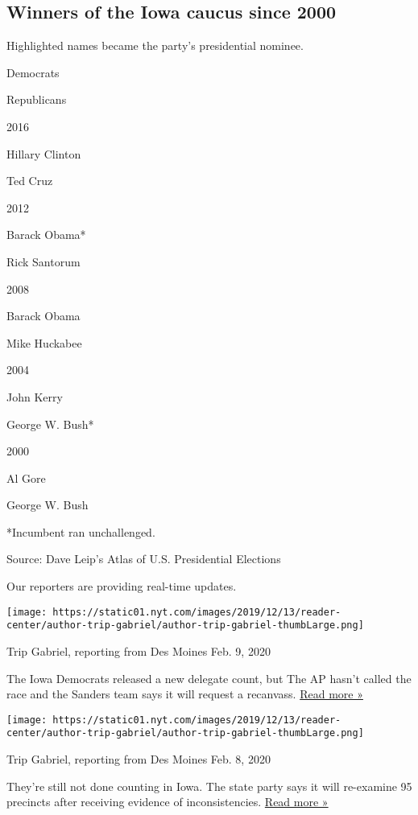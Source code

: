 \hypertarget{winners-of-the-iowa-caucus-since-2000}{%
\subsection{Winners of the Iowa caucus since
2000}\label{winners-of-the-iowa-caucus-since-2000}}

Highlighted names became the party's presidential nominee.

Democrats

Republicans

2016

Hillary Clinton

Ted Cruz

2012

Barack Obama*

Rick Santorum

2008

Barack Obama

Mike Huckabee

2004

John Kerry

George W. Bush*

2000

Al Gore

George W. Bush

*Incumbent ran unchallenged.

Source: Dave Leip's Atlas of U.S. Presidential Elections

Our reporters are providing real-time updates.

\texttt{[image: https://static01.nyt.com/images/2019/12/13/reader-center/author-trip-gabriel/author-trip-gabriel-thumbLarge.png]}

Trip Gabriel, reporting from Des Moines Feb. 9, 2020

The Iowa Democrats released a new delegate count, but The AP hasn't
called the race and the Sanders team says it will request a recanvass.
\href{https://www.nytimes.com/2020/02/09/us/politics/iowa-caucuses-democrats.html?action=click\&module=ELEX_results\&pgtype=Interactive\&region=ReporterUpdates}{Read
more »}

\texttt{[image: https://static01.nyt.com/images/2019/12/13/reader-center/author-trip-gabriel/author-trip-gabriel-thumbLarge.png]}

Trip Gabriel, reporting from Des Moines Feb. 8, 2020

They're still not done counting in Iowa. The state party says it will
re-examine 95 precincts after receiving evidence of inconsistencies.
\href{https://www.nytimes.com/live/2020/new-hampshire-primary-02-08?action=click\&module=ELEX_results\&pgtype=Interactive\&region=ReporterUpdates\#iowa-caucuses-95-precincts}{Read
more »}

